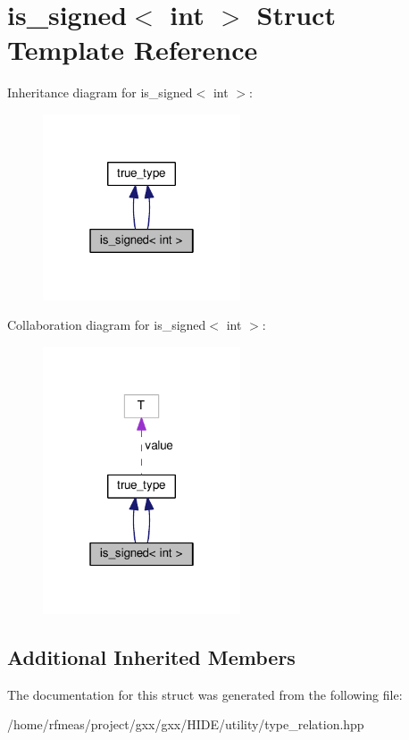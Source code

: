 \hypertarget{structis__signed_3_01int_01_4}{}\section{is\+\_\+signed$<$ int $>$ Struct Template Reference}
\label{structis__signed_3_01int_01_4}


Inheritance diagram for is\+\_\+signed$<$ int $>$\+:
\nopagebreak
\begin{figure}[H]
\begin{center}
\leavevmode
\includegraphics[width=166pt]{structis__signed_3_01int_01_4__inherit__graph}
\end{center}
\end{figure}


Collaboration diagram for is\+\_\+signed$<$ int $>$\+:
\nopagebreak
\begin{figure}[H]
\begin{center}
\leavevmode
\includegraphics[width=166pt]{structis__signed_3_01int_01_4__coll__graph}
\end{center}
\end{figure}
\subsection*{Additional Inherited Members}


The documentation for this struct was generated from the following file\+:\begin{DoxyCompactItemize}
\item 
/home/rfmeas/project/gxx/gxx/\+H\+I\+D\+E/utility/type\+\_\+relation.\+hpp\end{DoxyCompactItemize}
